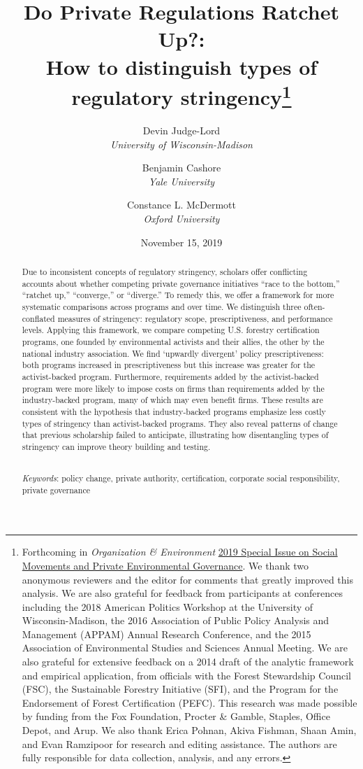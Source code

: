 \documentclass[
      12pt,
            Review ]{article}
\title{Do Private Regulations Ratchet Up?: 
           \\ How to distinguish types of regulatory stringency\thanks{Forthcoming in \emph{Organization \& Environment} \href{https://journals.sagepub.com/doi/full/10.1177/1086026619853783}{2019 Special Issue on Social Movements and Private Environmental Governance}. We thank two anonymous reviewers and the editor for comments that greatly improved this analysis. We are also grateful for feedback from participants at conferences including the 2018 American Politics Workshop at the University of Wisconsin-Madison, the 2016 Association of Public Policy Analysis and Management (APPAM) Annual Research Conference, and the 2015 Association of Environmental Studies and Sciences Annual Meeting. We are also grateful for extensive feedback on a 2014 draft of the analytic framework and empirical application, from officials with the Forest Stewardship Council (FSC), the Sustainable Forestry Initiative (SFI), and the Program for the Endorsement of Forest Certification (PEFC). This research was made possible by funding from the Fox Foundation, Procter \& Gamble, Staples, Office Depot, and Arup. We also thank Erica Pohnan, Akiva Fishman, Shaan Amin, and Evan Ramzipoor for research and editing assistance. The authors are fully responsible for data collection, analysis, and any errors.}}
\author{ %
            Devin Judge-Lord  \\ \emph{University of Wisconsin-Madison} 
             \and 
            Benjamin Cashore  \\ \emph{Yale University} 
             \and 
            Constance L. McDermott  \\ \emph{Oxford University} 
            }
\date{November 15, 2019}
\begin{document}
 


  \maketitle




  \begin{abstract}
    \noindent Due to inconsistent concepts of regulatory stringency, scholars offer conflicting accounts about whether competing private governance initiatives ``race to the bottom,'' ``ratchet up,'' ``converge,'' or ``diverge.'' To remedy this, we offer a framework for more systematic comparisons across programs and over time. We distinguish three often-conflated measures of stringency: regulatory scope, prescriptiveness, and performance levels. Applying this framework, we compare competing U.S. forestry certification programs, one founded by environmental activists and their allies, the other by the national industry association. We find `upwardly divergent' policy prescriptiveness: both programs increased in prescriptiveness but this increase was greater for the activist-backed program. Furthermore, requirements added by the activist-backed program were more likely to impose costs on firms than requirements added by the industry-backed program, many of which may even benefit firms. These results are consistent with the hypothesis that industry-backed programs emphasize less costly types of stringency than activist-backed programs. They also reveal patterns of change that previous scholarship failed to anticipate, illustrating how disentangling types of stringency can improve theory building and testing. 

          \hfill \\ 
      \noindent \emph{Keywords}: policy change, private authority, certification, corporate social responsibility, private governance 
    
  \end{abstract}










\noindent 
      \doublespacing 
    \newpage
\end{document}

